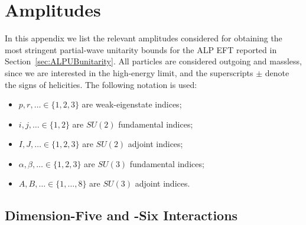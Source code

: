 \section{Amplitudes\label{app:ALPUBamplitudes}}

In this appendix we list the relevant amplitudes considered for obtaining the most stringent partial-wave unitarity bounds for the ALP EFT reported in Section~\ref{sec:ALPUBunitarity}.
%
All particles are considered outgoing and massless, since we are interested in the high-energy limit, and the superscripts $\pm$ denote the signs of helicities. 
%
The following notation is used: 
\begin{itemize}
    \item $p,r,\dotsc\in\{1,2,3\}$ are weak-eigenstate indices;
    \item $i,j,\dotsc\in\{1,2\}$ are $SU(2)$ fundamental indices;
    \item $I,J,\dotsc \in \{1,2,3\}$ are $SU(2)$ adjoint indices;
    \item $\alpha,\beta,\dotsc \in\{1,2,3\}$ are $SU(3)$ fundamental indices;
    \item $A,B,\dotsc \in \{1,\dotsc,8\}$ are $SU(3)$ adjoint indices.
\end{itemize}

\subsection{Dimension-Five and -Six Interactions\label{app:amplitudes5e6}}

